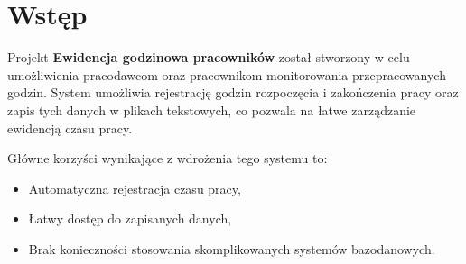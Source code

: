 \chapter*{Wstęp}
Projekt \textbf{Ewidencja godzinowa pracowników} został stworzony w celu umożliwienia pracodawcom oraz pracownikom monitorowania przepracowanych godzin. System umożliwia rejestrację godzin rozpoczęcia i zakończenia pracy oraz zapis tych danych w plikach tekstowych, co pozwala na łatwe zarządzanie ewidencją czasu pracy.

\noindent Główne korzyści wynikające z wdrożenia tego systemu to:
\begin{itemize}
    \item Automatyczna rejestracja czasu pracy,
    \item Łatwy dostęp do zapisanych danych,
    \item Brak konieczności stosowania skomplikowanych systemów bazodanowych.
\end{itemize}
